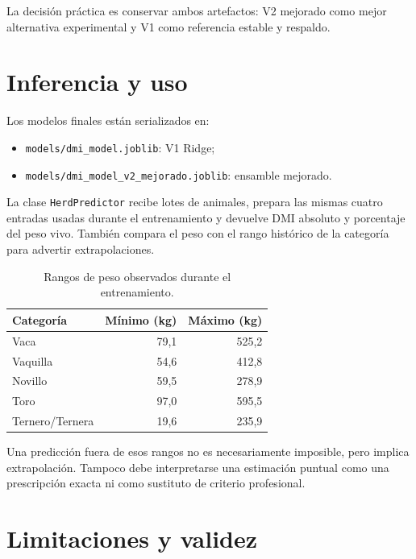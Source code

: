 \documentclass[11pt,a4paper]{article}
\newcommand{\codigo}[1]{\nolinkurl{#1}}
\begin{document}
La decisión práctica es conservar ambos artefactos: V2 mejorado como mejor alternativa experimental y V1 como referencia estable y respaldo.

\section{Inferencia y uso}

Los modelos finales están serializados en:
\begin{itemize}
  \item \codigo{models/dmi_model.joblib}: V1 Ridge;
  \item \codigo{models/dmi_model_v2_mejorado.joblib}: ensamble mejorado.
\end{itemize}

La clase \codigo{HerdPredictor} recibe lotes de animales, prepara las mismas cuatro entradas usadas durante el entrenamiento y devuelve DMI absoluto y porcentaje del peso vivo. También compara el peso con el rango histórico de la categoría para advertir extrapolaciones.

\begin{table}[H]
\centering
\caption{Rangos de peso observados durante el entrenamiento.}
\begin{tabular}{lrr}
\toprule
\textbf{Categoría} & \textbf{Mínimo (kg)} & \textbf{Máximo (kg)}\\
\midrule
Vaca & 79,1 & 525,2\\
Vaquilla & 54,6 & 412,8\\
Novillo & 59,5 & 278,9\\
Toro & 97,0 & 595,5\\
Ternero/Ternera & 19,6 & 235,9\\
\bottomrule
\end{tabular}
\end{table}

Una predicción fuera de esos rangos no es necesariamente imposible, pero implica extrapolación. Tampoco debe interpretarse una estimación puntual como una prescripción exacta ni como sustituto de criterio profesional.

\section{Limitaciones y validez}
\end{document}
